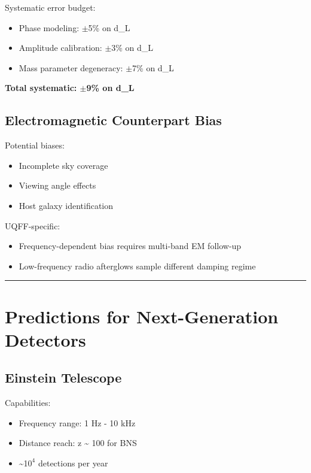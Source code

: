 \documentclass[12pt,a4paper]{article}
\begin{document}
Systematic error budget:

\begin{itemize}
  \item Phase modeling: $\pm$5\% on d\_L
  \item Amplitude calibration: $\pm$3\% on d\_L
  \item Mass parameter degeneracy: $\pm$7\% on d\_L
\end{itemize}

\textbf{Total systematic: $\pm$9\% on d\_L}

\subsection{Electromagnetic Counterpart Bias}

Potential biases:

\begin{itemize}
  \item Incomplete sky coverage
  \item Viewing angle effects
  \item Host galaxy identification
\end{itemize}

UQFF-specific:

\begin{itemize}
  \item Frequency-dependent bias requires multi-band EM follow-up
  \item Low-frequency radio afterglows sample different damping regime
\end{itemize}

\medskip\hrule\medskip

\section{Predictions for Next-Generation Detectors}

\subsection{Einstein Telescope}

Capabilities:

\begin{itemize}
  \item Frequency range: 1 Hz - 10 kHz
  \item Distance reach: z \textasciitilde{} 100 for BNS
  \item \textasciitilde{}1$0^{4}$ detections per year
\end{itemize}
\end{document}
